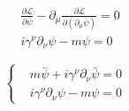 \documentclass[11pt]{article}
\newcommand{\lagr}{\mathcal{L}}
\begin{document}
\begin{equation}
\begin{split}
    &\frac{\partial\lagr}{\partial\bar\psi} - \partial_\mu\frac{\partial\lagr}{\partial(\partial_\mu\bar\psi)}=0\\
    & i\gamma^\nu\partial_\nu\psi - m\psi = 0
\end{split}
\end{equation}

\begin{equation}
    \boxed{\begin{cases} & m\bar\psi + i\gamma^\nu\partial_\nu\bar\psi = 0 \\ & i\gamma^\nu\partial_\nu\psi - m\psi = 0 
    \end{cases}}
\end{equation}
\end{document}
